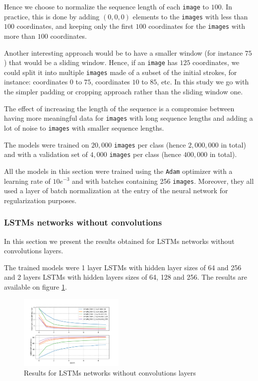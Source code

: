 \documentclass[10pt,twocolumn,letterpaper]{article}
\begin{document}
Hence we choose to normalize the sequence length of each \texttt{image} to $100$. In practice, this is done by adding $(0, 0, 0)$ elements to the \texttt{images} with less than $100$ coordinates, and keeping only the first $100$ coordinates for the \texttt{images} with more than $100$ coordinates.

Another interesting approach would be to have a smaller window (for instance $75$) that would be a sliding window. Hence, if an \texttt{image} has $125$ coordinates, we could split it into multiple \texttt{images} made of a subset of the initial strokes, for instance: coordinates $0$ to $75$, coordinates $10$ to $85$, etc. 
In this study we go with the simpler padding or cropping approach rather than the sliding window one.

The effect of increasing the length of the sequence is a compromise between having more meaningful data for \texttt{images} with long sequence lengths and adding a lot of noise to \texttt{images} with smaller sequence lengths. 


The models were trained on $20,000$ \texttt{images} per class (hence $2,000,000$ in total) and with a validation set of $4,000$ \texttt{images} per class (hence $400,000$ in total).

All the models in this section were trained using the \texttt{Adam} optimizer \cite{kingma2014adam} with a learning rate of $10e^{-3}$ and with batches containing 256 \texttt{images}. Moreover, they all used a layer of batch normalization \cite{ioffe2015batch} at the entry of the neural network for regularization purposes. 


\subsubsection{LSTMs networks without convolutions}

In this section we present the results obtained for LSTMs networks without convolutions layers.

The trained models were 1 layer LSTMs with hidden layer sizes of 64 and 256 and 2 layers LSTMs with hidden layers sizes of 64, 128 and 256. The results are available on figure \ref{fig:lstm_results}.

\begin{figure}[h] 
\centering
\includegraphics[width=0.45\textwidth]{images/simple_lstm_results.png}
\caption{Results for LSTMs networks without convolutions layers}
\label{fig:lstm_results}
\end{figure}
\end{document}
